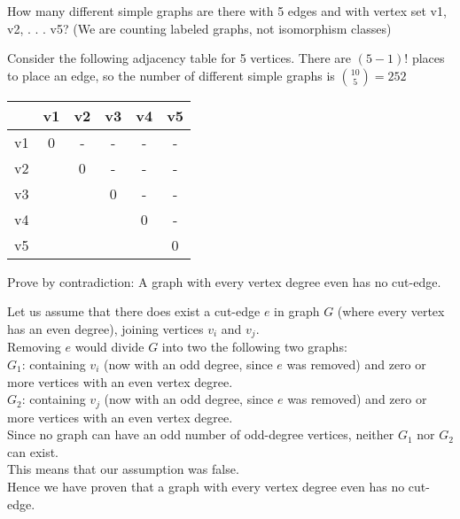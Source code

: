 \documentclass[12pt]{article}
\newenvironment{question}[2][Question]{\begin{trivlist}
\item[\hskip \labelsep {\bfseries #1}\hskip \labelsep {\bfseries #2.}]}{\end{trivlist}}
\begin{document}
\begin{question}{7}
 How many different simple graphs are there with 5 edges and with vertex set {v1, v2, . . . v5}?
(We are counting labeled graphs, not isomorphism classes)
\end{question}

Consider the following adjacency table for 5 vertices. There are $(5-1)!$ places to place an edge, so the number of different simple graphs is ${10 \choose 5}= 252$


	\begin{tabular}{c|c|c|c|c|c|}
		\cline{2-6}
		& v1 & v2 & v3 & v4 & v5 \\
		\hline
		\multicolumn{1}{|c|}{v1} & 0 & - & - & - & - \\
		\hline
		\multicolumn{1}{|c|}{v2} &   & 0 & - & - & - \\
		\hline
		\multicolumn{1}{|c|}{v3} &   &   & 0 & - & - \\
		\hline
		\multicolumn{1}{|c|}{v4} &   &   &   & 0 & - \\
		\hline
		\multicolumn{1}{|c|}{v5} &   &   &   &   & 0 \\
		\hline
	\end{tabular}


\begin{question}{8}
Prove by contradiction: A graph with every vertex degree even has no cut-edge.
\end{question}

Let us assume that there does exist a cut-edge $e$ in graph $G$ (where every vertex has an even degree), joining vertices $v_i$ and $v_j$.\\
Removing $e$ would divide $G$ into two the following two graphs:\\
$G_1$: containing $v_i$ (now with an odd degree, since $e$ was removed) and zero or more vertices with an even vertex degree.\\
$G_2$: containing $v_j$ (now with an odd degree, since $e$ was removed) and zero or more vertices with an even vertex degree.\\
Since no graph can have an odd number of odd-degree vertices, neither $G_1$ nor $G_2$ can exist.\\
This means that our assumption was false.\\
Hence we have proven that a graph with every vertex degree even has no cut-edge.




\end{document}
